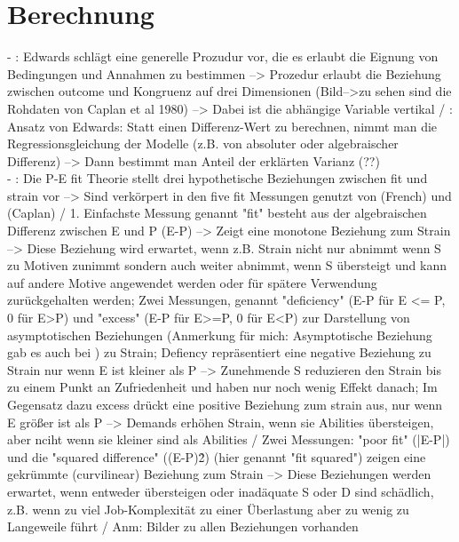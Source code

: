 \section{Berechnung}
\label{ch:personEnvironmentFit:berechnung}
- \cite[S. 15f.]{caplan:1993}: Edwards schlägt eine generelle Prozudur vor, die es erlaubt die Eignung von Bedingungen und Annahmen zu bestimmen --> Prozedur erlaubt die Beziehung zwischen outcome und Kongruenz auf drei Dimensionen (Bild-->zu sehen sind die Rohdaten von Caplan et al 1980) --> Dabei ist die abhängige Variable vertikal / \cite[S. 16]{caplan:1993}: Ansatz von Edwards: Statt einen Differenz-Wert zu berechnen, nimmt man die Regressionsgleichung der Modelle (z.B. von absoluter oder algebraischer Differenz) --> Dann bestimmt man Anteil der erklärten Varianz (??)\\
- \cite[S. 2]{edwards:1993}: Die P-E fit Theorie stellt drei hypothetische Beziehungen zwischen fit und strain vor --> Sind verkörpert in den five fit Messungen genutzt von (French) und (Caplan) / 1. Einfachste Messung genannt "fit" besteht aus der algebraischen Differenz zwischen E und P (E-P) --> Zeigt eine monotone Beziehung zum Strain --> Diese Beziehung wird erwartet, wenn z.B. Strain nicht nur abnimmt wenn S zu Motiven zunimmt sondern auch weiter abnimmt, wenn S übersteigt und kann auf andere Motive angewendet werden oder für spätere Verwendung zurückgehalten werden; Zwei Messungen, genannt "deficiency" (E-P für E <= P, 0 für E>P) und "excess" (E-P für E>=P, 0 für E<P) zur Darstellung von asymptotischen Beziehungen (Anmerkung für mich: Asymptotische Beziehung gab es auch bei \cite{edwards:1996}) zu Strain; Defiency repräsentiert eine negative Beziehung zu Strain nur wenn E ist kleiner als P --> Zunehmende S reduzieren den Strain bis zu einem Punkt an Zufriedenheit und haben nur noch wenig Effekt danach; Im Gegensatz dazu excess drückt eine positive Beziehung zum strain aus, nur wenn E größer ist als P --> Demands erhöhen Strain, wenn sie Abilities übersteigen, aber nciht wenn sie kleiner sind als Abilities / Zwei Messungen: "poor fit" (|E-P|) und die "squared difference" ((E-P)\^2) (hier genannt "fit squared") zeigen eine gekrümmte (curvilinear) Beziehung zum Strain --> Diese Beziehungen werden erwartet, wenn entweder übersteigen oder inadäquate S oder D sind schädlich, z.B. wenn zu viel Job-Komplexität zu einer Überlastung aber zu wenig zu Langeweile führt / Anm: Bilder zu allen Beziehungen vorhanden \\
